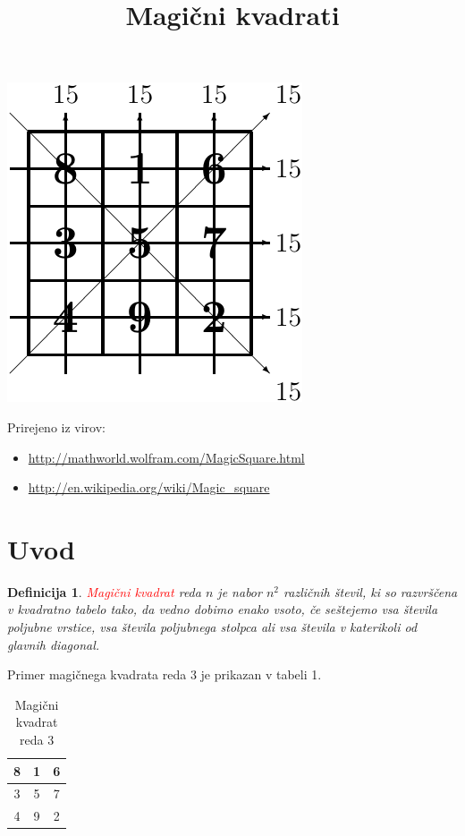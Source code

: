 \documentclass[a4paper,12pt]{article}
\newtheorem{definicija}[izrek]{Definicija}
\begin{document}
\title{Magični kvadrati}
\date{}
\maketitle
\begin{center}
   \includegraphics{slika.pdf}
\end{center}

Prirejeno iz virov:

\begin{itemize}
   \item \url{http://mathworld.wolfram.com/MagicSquare.html}
   \item \url{http://en.wikipedia.org/wiki/Magic_square}
\end{itemize}

\tableofcontents

\newpage

\section{Uvod}

\begin{definicija}
   \textcolor{red}{\emph{Magični kvadrat}} reda $n$ je nabor $n^2$ različnih števil,
   ki so razvrščena v kvadratno tabelo tako, da vedno dobimo enako vsoto,
   če seštejemo vsa števila poljubne vrstice, vsa števila poljubnega
   stolpca ali vsa števila v katerikoli od glavnih diagonal.
\end{definicija}

Primer magičnega kvadrata reda 3 je prikazan v tabeli 1.

\begin{table}[h]
   \centering
   \large
   \caption{Magični kvadrat reda 3}
   \begin{tabular}{|c|c|c|}
      \hline
         8 & 1 & 6 \\\hline
         3 & 5 & 7 \\\hline
         4 & 9 & 2 \\\hline
   \end{tabular}
   \label{table:mag3}
\end{table}
\end{document}
